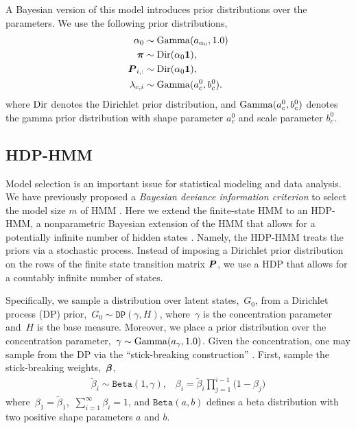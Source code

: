 A Bayesian version of this model introduces prior distributions over
the parameters. We use the following prior distributions,
\begin{align}
\alpha_0 &\sim \mathrm{Gamma}(a_{\alpha_0}, 1.0) \\
\nonumber \boldsymbol{\pi} &\sim \mathrm{Dir}(\alpha_0\boldsymbol{1}),\\
\nonumber \boldsymbol{P}_{i,:} &\sim \mathrm{Dir}(\alpha_0\boldsymbol{1}), \\
\nonumber \lambda_{c,i} &\sim \mathrm{Gamma}(a_c^0,b_c^0).
\end{align}
where $\mathrm{Dir}$ denotes the Dirichlet prior distribution, and
$\mathrm{Gamma}(a_c^0,b_c^0)$ denotes the gamma prior distribution with
shape parameter $a_c^0$ and scale parameter $b_c^0$.

\subsection{HDP-HMM}

Model selection is an important issue for statistical modeling and
data analysis.  We have previously proposed a {\em Bayesian deviance
  information criterion} to select the model size $m$ of HMM
\citep{Chen12a,Chen14}. Here we extend the finite-state HMM to an
HDP-HMM, a nonparametric Bayesian extension of the HMM that allows for
a potentially infinite number of hidden states \citep{Teh06,
  Beal02}. Namely, the HDP-HMM treats the priors via a stochastic
process. Instead of imposing a Dirichlet prior distribution on the
rows of the finite state transition matrix $\boldsymbol{P}$, we use a HDP that
allows for a countably infinite number of states.

Specifically, we sample a distribution over latent states,~$G_0$, from
a Dirichlet process (DP) \citep{Ferguson73}
prior,~${G_0\sim\texttt{DP}(\gamma,H)}$, where~$\gamma$ is the
concentration parameter and~$H$ is the base measure.  Moreover, we
place a prior distribution over the concentration parameter,~$\gamma
\sim \mathrm{Gamma}(a_{\gamma}, 1.0)$.  Given the concentration, one may
sample from the DP via the ``stick-breaking construction''
\citep{Sethuraman94}. First, sample the stick-breaking
weights,~$\boldsymbol{\beta}$,
\begin{eqnarray}                                   
\tilde{\beta}_{i}\sim \texttt{Beta}(1,\gamma), \;\;\; \beta_{i}=\tilde{\beta}_{i}\prod_{j=1}^{i-1}\Big(1-\beta_{j}\Big)
\label{stick1}
\end{eqnarray}
where~$\beta_1 = \tilde{\beta}_1$,~$\sum_{i=1}^\infty \beta_{i}=1$,
and $\texttt{Beta}(a,b)$ defines a beta distribution with two positive
shape parameters $a$ and $b$.

